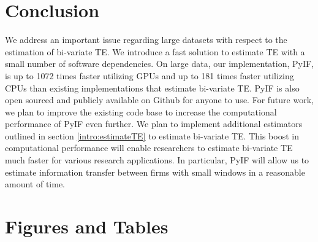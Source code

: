 \section{Conclusion}

We address an important issue regarding large datasets with respect to the estimation of bi-variate TE. We introduce a fast solution to estimate TE with a small number of software dependencies. On large data, our implementation, PyIF, is up to 1072 times faster utilizing GPUs and up to 181 times faster utilizing CPUs than existing implementations that estimate bi-variate TE.  PyIF is also open sourced and publicly available on Github for anyone to use.  For future work, we plan to improve the existing code base to increase the computational performance of PyIF even further. We plan to implement additional estimators outlined in section  \ref{intro:estimateTE} to estimate bi-variate TE. This boost in computational performance will enable researchers to estimate bi-variate TE much faster for various research applications. In particular, PyIF will allow us to estimate information transfer between firms with small windows in a reasonable amount of time.

\clearpage
\section{Figures and Tables}



